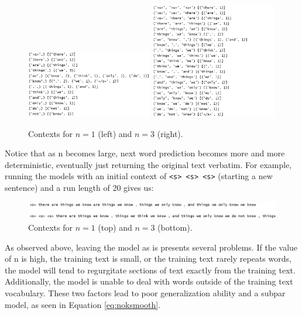 \documentclass[11pt]{article}
\begin{document}
\begin{figure}[ht!]
    \centering
    \includegraphics[width=0.49\textwidth]{smooth1.png}
    \includegraphics[width=0.49\textwidth]{smooth3.png}
    \caption{Contexts for $n=1$ (left) and $n=3$ (right).}
    \label{fig:smooth}
\end{figure}

Notice that as n becomes large, next word prediction becomes more and more deterministic, eventually just returning the original text verbatim. For example, running the models with an initial context of \texttt{<s> <s> <s>} (starting a new sentence) and a run length of 20 gives us:

\begin{figure}[ht!]
    \centering
    \includegraphics[width=1\textwidth]{two sentences.png}
    \caption{Contexts for $n=1$ (top) and $n=3$ (bottom).}
    \label{fig:contexts}
\end{figure}

As observed above, leaving the model as is presents several problems.  If the value of n is high, the training text is small, or the training text rarely repeats words, the model will tend to regurgitate sections of text exactly from the training text.  Additionally, the model is unable to deal with words outside of the training text vocabulary.  These two factors lead to poor generalization ability and a subpar model, as seen in Equation \ref{eq:noksmooth}.\\
\end{document}
